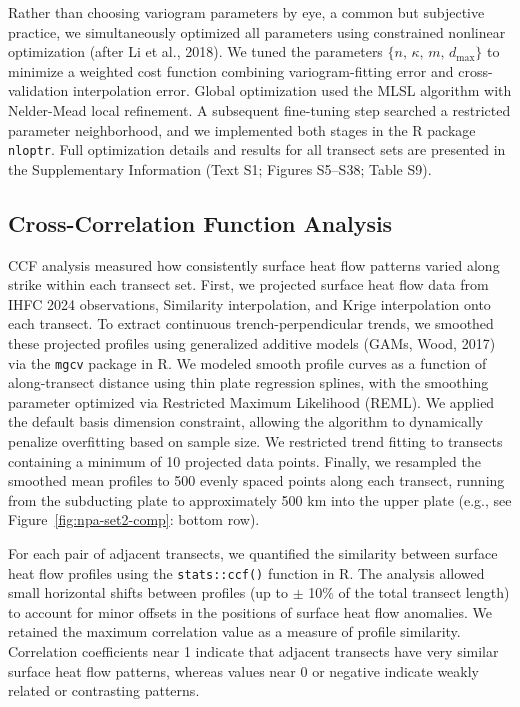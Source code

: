 \documentclass[draft,linenumbers]{agujournal2019}
\begin{document}
Rather than choosing variogram parameters by eye, a common but
subjective practice, we simultaneously optimized all parameters using
constrained nonlinear optimization (after Li et al., 2018). We tuned the
parameters \(\{n,\, \kappa,\, m,\, d_\mathrm{max}\}\) to minimize a
weighted cost function combining variogram-fitting error and
cross-validation interpolation error. Global optimization used the MLSL
algorithm with Nelder-Mead local refinement. A subsequent fine-tuning
step searched a restricted parameter neighborhood, and we implemented
both stages in the R package \texttt{nloptr}. Full optimization details
and results for all transect sets are presented in the Supplementary
Information (Text S1; Figures S5--S38; Table S9).

\subsection{Cross-Correlation Function
Analysis}\label{sec:cross-correlation-function-analysis}

CCF analysis measured how consistently surface heat flow patterns varied
along strike within each transect set. First, we projected surface heat
flow data from IHFC 2024 observations, Similarity interpolation, and
Krige interpolation onto each transect. To extract continuous
trench-perpendicular trends, we smoothed these projected profiles using
generalized additive models (GAMs, Wood, 2017) via the \texttt{mgcv}
package in R. We modeled smooth profile curves as a function of
along-transect distance using thin plate regression splines, with the
smoothing parameter optimized via Restricted Maximum Likelihood (REML).
We applied the default basis dimension constraint, allowing the
algorithm to dynamically penalize overfitting based on sample size. We
restricted trend fitting to transects containing a minimum of 10
projected data points. Finally, we resampled the smoothed mean profiles
to 500 evenly spaced points along each transect, running from the
subducting plate to approximately 500 km into the upper plate (e.g., see
Figure~\ref{fig:npa-set2-comp}: bottom row).

For each pair of adjacent transects, we quantified the similarity
between surface heat flow profiles using the \texttt{stats::ccf()}
function in R. The analysis allowed small horizontal shifts between
profiles (up to \(\pm\) 10\% of the total transect length) to account
for minor offsets in the positions of surface heat flow anomalies. We
retained the maximum correlation value as a measure of profile
similarity. Correlation coefficients near 1 indicate that adjacent
transects have very similar surface heat flow patterns, whereas values
near 0 or negative indicate weakly related or contrasting patterns.
\end{document}
